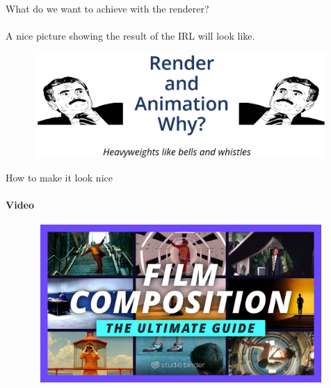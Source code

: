 \documentclass[aspectratio=169]{beamer}
\newcommand{\fbckg}[1]{\usebackgroundtemplate{\texttt{[image: \#1]}}}%
\begin{document}
\begin{frame}[t]{What do we want to achieve with the renderer?}
\framesubtitle{}
    \centering \LARGE A nice picture showing the result of the IRL will look like.

    \begin{figure}[H]
        \centering\includegraphics[height=4cm,width=1\textwidth,keepaspectratio]{why.png}
        \label{fig:why.png}
    \end{figure}

\end{frame}

\usebackgroundtemplate{}

\fbckg{fibeamer/figs/common.png}

\begin{frame}[t]{How to make it look nice}
    \framesubtitle{Video}
    \vspace{-0.6cm}
    \begin{figure}[H]
        \href{https://youtu.be/hUmZldt0DTg}{
            \centering\includegraphics[height=6cm,width=1\textwidth,keepaspectratio]{filmcomposition_video.jpg}}
        \label{fig:filmcomposition_video.jpg}
    \end{figure}
\end{frame}
\end{document}

